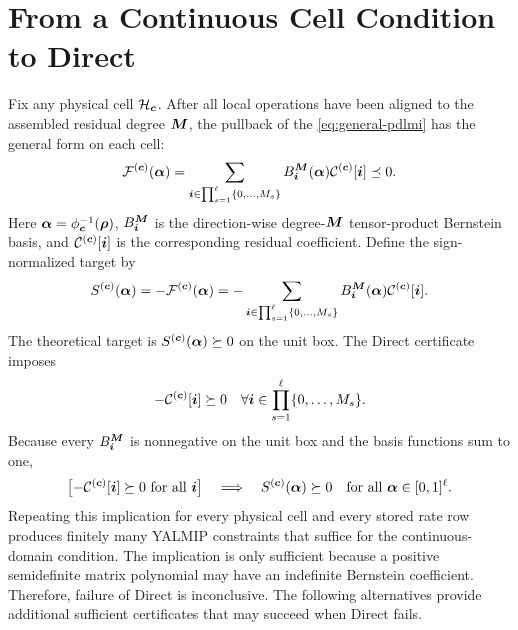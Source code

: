 \section{From a Continuous Cell Condition to Direct}
\label{sec:cellwise-solver-path}

Fix any physical cell $\mathcal H_{\boldsymbol{c}}$. After all local operations have been aligned to the assembled residual degree $\boldsymbol{M}$, the pullback of the \cref{eq:general-pdlmi} has the general form on each cell:
\begin{gather*}
    \mathcal F^{(\boldsymbol{c})}(\boldsymbol{\alpha})
    =\sum_{\boldsymbol{i}\in\prod_{s=1}^{\ell}\{0,\ldots,M_s\}}
    B_{\boldsymbol{i}}^{\boldsymbol{M}}(\boldsymbol{\alpha})
    \mathcal C^{(\boldsymbol{c})}[\boldsymbol{i}]
    \preceq0.
\end{gather*}
Here $\boldsymbol{\alpha}=\phi_{\boldsymbol{c}}^{-1}(\boldsymbol{\rho})$, $B_{\boldsymbol{i}}^{\boldsymbol{M}}$ is the direction-wise degree-$\boldsymbol{M}$ tensor-product Bernstein basis, and $\mathcal C^{(\boldsymbol{c})}[\boldsymbol{i}]$ is the corresponding residual coefficient. Define the sign-normalized target by
\begin{gather*}
    S^{(\boldsymbol{c})}(\boldsymbol{\alpha})
    =-\mathcal F^{(\boldsymbol{c})}(\boldsymbol{\alpha})
    =-\sum_{\boldsymbol{i}\in\prod_{s=1}^{\ell}\{0,\ldots,M_s\}}
    B_{\boldsymbol{i}}^{\boldsymbol{M}}(\boldsymbol{\alpha})
    \mathcal C^{(\boldsymbol{c})}[\boldsymbol{i}].
\end{gather*}
The theoretical target is $S^{(\boldsymbol{c})}(\boldsymbol{\alpha})\succeq0$ on the unit box. The Direct certificate imposes
\begin{gather*}
    -\mathcal C^{(\boldsymbol{c})}[\boldsymbol{i}]\succeq0
    \quad \forall \boldsymbol{i}\in\prod_{s=1}^{\ell}\{0,\ldots,M_s\}.
\end{gather*}
Because every $B_{\boldsymbol{i}}^{\boldsymbol{M}}$ is nonnegative on the unit box and the basis functions sum to one,
\begin{gather*}
    \bigl[-\mathcal C^{(\boldsymbol{c})}[\boldsymbol{i}]\succeq0\ \text{for all }\boldsymbol{i}\bigr]
    \quad\Longrightarrow\quad
    S^{(\boldsymbol{c})}(\boldsymbol{\alpha})\succeq0
    \quad\text{for all }\boldsymbol{\alpha}\in[0,1]^\ell.
\end{gather*}
Repeating this implication for every physical cell and every stored rate row produces finitely many YALMIP constraints that suffice for the continuous-domain condition. The implication is only sufficient because a positive semidefinite matrix polynomial may have an indefinite Bernstein coefficient. Therefore, failure of Direct is inconclusive. The following alternatives provide additional sufficient certificates that may succeed when Direct fails.

